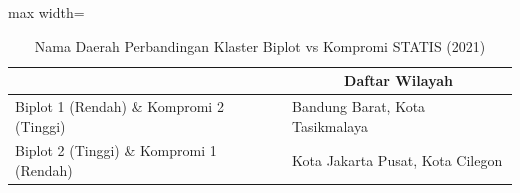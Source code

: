 \begin{table}[H]
\centering
\caption{Nama Daerah Perbandingan Klaster Biplot vs Kompromi STATIS (2021)} \label{tab:sample1biplot_comp_name_2021}
\begin{adjustbox}{max width=\textwidth}
\begin{tabular}{|>{\centering\arraybackslash}p{4cm}|p{10cm}|}
\hline
\multicolumn{1}{|c|}{\textbf{Kategori}} & \multicolumn{1}{c|}{\textbf{Daftar Wilayah}} \\
\hline
Biplot 1 (Rendah) \& Kompromi 2 (Tinggi) & Bandung Barat, Kota Tasikmalaya \\
\hline
Biplot 2 (Tinggi) \& Kompromi 1 (Rendah) & Kota Jakarta Pusat, Kota Cilegon \\
\hline
\end{tabular}
\end{adjustbox}
\end{table}